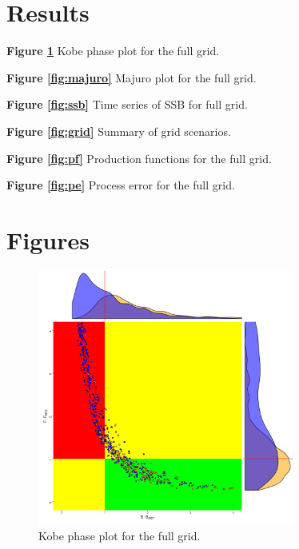 \documentclass[a4paper]{article}
\begin{document}
\section{Results}

\textbf{Figure \ref{fig:kobe}} Kobe phase plot for the full grid.

\textbf{Figure \ref{fig:majuro}} Majuro  plot for the full grid.

\textbf{Figure \ref{fig:ssb}} Time series of SSB for full grid.

\textbf{Figure \ref{fig:grid}} Summary of grid scenarios.

\textbf{Figure \ref{fig:pf}} Production functions for the full grid.

\textbf{Figure \ref{fig:pe}} Process error for the full grid.





\section{Figures}
\newpage\clearpage

\begin{figure}
\centering
\includegraphics[width=0.75\textwidth]{alb-kobe1-1.png}
\caption{\label{fig:kobe} Kobe phase plot for the full grid.}
\end{figure}
\end{document}
